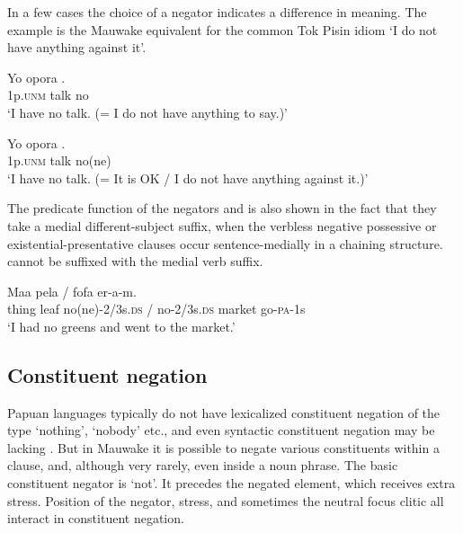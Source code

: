 In a few cases the choice of a negator indicates a difference in meaning. The example  is the Mauwake equivalent for the common Tok Pisin idiom  `I do not have anything against it'.

\ea%
\label{ex:6:x1129}
\gll Yo  opora  . \\
1p.\textsc{unm}  talk  no\\
\glt `I have no talk. (= I do not have anything to say.)'
\z

\ea%
\label{ex:6:x1130}
\gll Yo  opora  . \\
1p.\textsc{unm}  talk  no(ne)\\
\glt `I have no talk. (= It is OK / I do not have anything against it.)'
\z

The predicate function of the negators  and  is also shown in the fact that they take a medial different-subject suffix, when the verbless negative possessive or existential-presentative clauses occur sentence-medially in a chaining structure.  cannot be suffixed with the medial verb suffix.

\ea%
\label{ex:6:x1101}
\gll Maa  pela    /    fofa  er-a-m. \\
thing  leaf  no(ne)-2/3s.\textsc{ds}  /  no-2/3s.\textsc{ds}  market  go-\textsc{pa}-1s\\
\glt `I had no greens and went to the market.'
\z

\subsection{Constituent negation} \label{sec:6.2.2}

Papuan languages typically do not have lexicalized constituent negation of the type `nothing', `nobody' etc., and even syntactic constituent negation may be lacking \citep[271--272]{Reesink1987}. But in Mauwake it is possible to negate various constituents within a clause, and, although very rarely, even inside a noun phrase. The basic constituent negator is  `not'. It precedes the negated element, which receives extra stress. Position of the negator, stress, and sometimes the neutral focus clitic all interact in constituent negation.

